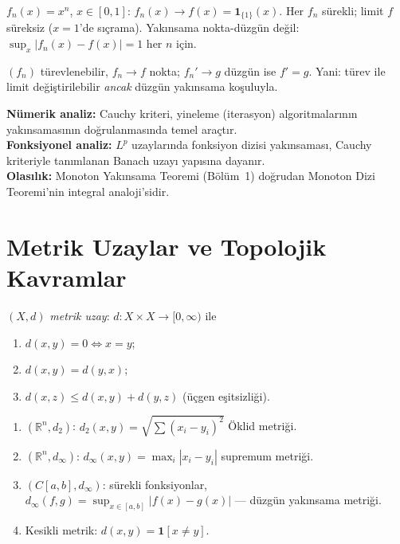 \begin{karsiornek}
$f_n(x) = x^n$, $x \in [0,1]$: $f_n(x) \to f(x) = \mathbf{1}_{\{1\}}(x)$.
Her $f_n$ sürekli; limit $f$ süreksiz ($x=1$'de sıçrama).
Yakınsama nokta-düzgün değil: $\sup_x |f_n(x) - f(x)| = 1$ her $n$ için.
\end{karsiornek}

\begin{onerme}
$(f_n)$ türevlenebilir, $f_n \to f$ nokta; $f_n' \to g$ düzgün ise $f' = g$.
Yani: türev ile limit değiştirilebilir \emph{ancak} düzgün yakınsama koşuluyla.
\end{onerme}

\begin{disiplinlerarasibaglan}
\textbf{Nümerik analiz:} Cauchy kriteri, yineleme (iterasyon) algoritmalarının
yakınsamasının doğrulanmasında temel araçtır.\\
\textbf{Fonksiyonel analiz:} $L^p$ uzaylarında fonksiyon dizisi yakınsaması,
Cauchy kriteriyle tanımlanan Banach uzayı yapısına dayanır.\\
\textbf{Olasılık:} Monoton Yakınsama Teoremi (Bölüm~1) doğrudan Monoton Dizi
Teoremi'nin integral analoji'sidir.
\end{disiplinlerarasibaglan}

\section{Metrik Uzaylar ve Topolojik Kavramlar}
\label{sec:metrik_uzaylar}

\begin{tanim}\label{def:metrik_uzay}
$(X,d)$ \emph{metrik uzay}: $d:X\times X\to[0,\infty)$ ile
\begin{enumerate}[(M1)]
  \item $d(x,y)=0\iff x=y$;
  \item $d(x,y)=d(y,x)$;
  \item $d(x,z)\leq d(x,y)+d(y,z)$ (üçgen eşitsizliği).
\end{enumerate}
\end{tanim}

\begin{ornek}\label{ex:metrikler}
\begin{enumerate}
  \item $(\mathbb{R}^n, d_2)$: $d_2(x,y)=\sqrt{\sum(x_i-y_i)^2}$ Öklid metriği.
  \item $(\mathbb{R}^n, d_\infty)$: $d_\infty(x,y)=\max_i|x_i-y_i|$ supremum metriği.
  \item $(C[a,b],d_\infty)$: sürekli fonksiyonlar, $d_\infty(f,g)=\sup_{x\in[a,b]}|f(x)-g(x)|$ --- düzgün yakınsama metriği.
  \item Kesikli metrik: $d(x,y)=\mathbf{1}[x\neq y]$.
\end{enumerate}
\end{ornek}

